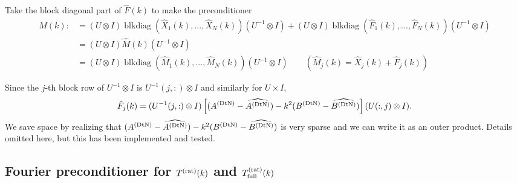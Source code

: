 Take the block diagonal part of $\hat{F}(k)$ to make the preconditioner
\begin{align*}
 M(k) 
 :&= 
 (U \otimes I)
 \operatorname{blkdiag}(\hat{X}_1(k),...,\hat{X}_N(k))
 (U^{-1} \otimes I)
 + 
 (U \otimes I)
 \operatorname{blkdiag}(\hat{F}_1(k),...,\hat{F}_N(k))
 (U^{-1} \otimes I) \\ 
 &= 
 (U \otimes I)\hat{M}(k)(U^{-1} \otimes I) \\ 
 &= 
 (U \otimes I)
 \operatorname{blkdiag}(\hat{M}_1(k),...,\hat{M}_N(k))
 (U^{-1} \otimes I)
 \qquad
 \left(\hat{M}_j(k) = \hat{X}_j(k) + \hat{F}_j(k)\right)
\end{align*}

Since the $j$-th block row
of $U^{-1} \otimes I$ is $U^{-1}(j,:) \otimes I$ and similarly for
$U \times I$,
\begin{align*}
 \hat{F}_j(k)
 = 
 (U^{-1}(j,:) \otimes I)
 \left[(A^{(\text{DtN})} - \widehat{A^{(\text{DtN})}}) - k^2(B^{(\text{DtN})} - \widehat{B^{(\text{DtN})}})\right]
 (U     (:,j) \otimes I).
\end{align*}
We save space by realizing that 
$(A^{(\text{DtN})} - \widehat{A^{(\text{DtN})}}) - k^2(B^{(\text{DtN})} - \widehat{B^{(\text{DtN})}})$
is very sparse and we can write it as an outer product. Details
omitted here, but this has been implemented and tested.


\subsection{Fourier preconditioner for $T^{(\text{rat})}(k)$ and $T^{(\text{rat})}_{\text{full}}(k)$}

